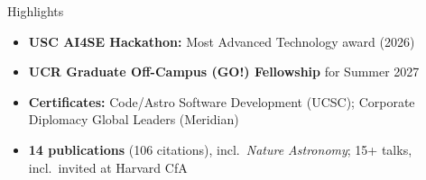 \documentclass[]{kyvernitis-resume}
\begin{document}
\begin{section}{Highlights}
\begin{itemize}
    \item \textbf{USC AI4SE Hackathon:} Most Advanced Technology award (2026)
    \item \textbf{UCR Graduate Off-Campus (GO!) Fellowship} for Summer 2027
    \item \textbf{Certificates:} Code/Astro Software Development (UCSC); Corporate Diplomacy Global Leaders (Meridian)
    \item \textbf{14 publications} (106 citations), incl.\ \textit{Nature Astronomy}; 15+ talks, incl.\ invited at Harvard CfA
\end{itemize}
\end{section}
\end{document}
